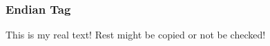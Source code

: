 \subsubsection{Endian Tag} \label{subsubsection:counter-reengineering-break-endian}
This is my real text! Rest might be copied or not be checked!
